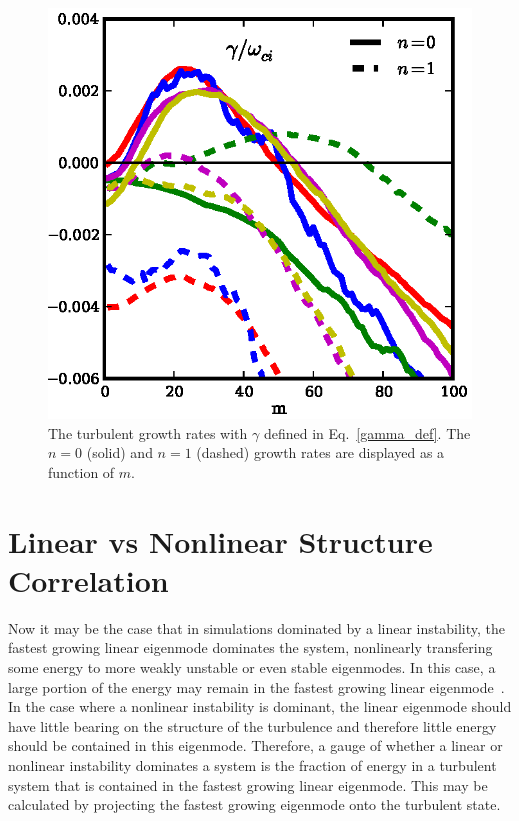 \documentclass[showpacs,preprintnumbers,amsmath,amssymb,superscriptaddress,aip]{revtex4-1}
\begin{document}
\begin{figure}[!htbp]
\includegraphics[]{lin_vs_nl_gamma}
\hfil
\caption{ The turbulent growth rates with $\gamma$ defined in Eq.~\ref{gamma_def}. The $n=0$ (solid) and $n = 1$ (dashed) 
growth rates are displayed as a function of $m$.}
\label{nl_vs_lin_gamma}
\end{figure}



\section{Linear vs Nonlinear Structure Correlation}
\label{Sec_lin_vs_nl}

Now it may be the case that in simulations dominated by a linear instability, the fastest growing linear
eigenmode dominates the system, nonlinearly transfering some energy to more weakly unstable or even stable eigenmodes. In this case, a large portion of the energy may remain in the fastest
growing linear eigenmode~\cite{hatch2011}. In the case where a nonlinear instability is dominant, the linear eigenmode should have little bearing on the structure of the turbulence and therefore little
energy should be contained in this eigenmode. Therefore, a gauge of whether a linear or nonlinear instability dominates a system is the fraction of energy in a turbulent system
that is contained in the fastest growing linear eigenmode. This may be calculated by projecting the fastest growing eigenmode onto the turbulent state.
\end{document}
